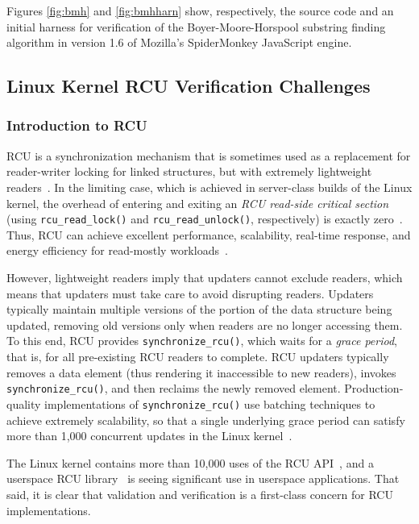 \documentclass[conference]{IEEEtran}
\newcommand{\co}[1]{\lstinline[breaklines=yes,breakatwhitespace=yes]{#1}}
\begin{document}
Figures \ref{fig:bmh} and \ref{fig:bmhharn} show, respectively, the
source code and an initial harness for verification of the
Boyer-Moore-Horspool substring finding algorithm \cite{BMH,CFV13} in
version 1.6 of Mozilla's SpiderMonkey JavaScript engine.

\subsection{Linux Kernel RCU Verification Challenges}

\subsubsection{Introduction to RCU}
\label{sec:Introduction to RCU}

RCU is a synchronization mechanism that is sometimes used as a replacement
for reader-writer locking for linked structures, but with extremely
lightweight readers~\cite{McKenney:2013:SDS:2483852.2483867}.
In the limiting case, which is achieved in server-class builds of the
Linux kernel, the overhead of entering and exiting an \emph{RCU read-side
critical section} (using \co{rcu_read_lock()} and \co{rcu_read_unlock()},
respectively) is exactly zero~\cite{McKenney98}.
Thus, RCU can achieve excellent performance, scalability, real-time
response, and energy efficiency for read-mostly
workloads~\cite{McKenney:2013:SDS:2483852.2483867,DinakarGuniguntala2008IBMSysJ,PaulMcKenney2013AMPenergyHOTPAR}.

However, lightweight readers imply that updaters cannot exclude readers,
which means that updaters must take care to avoid disrupting readers.
Updaters typically maintain multiple versions of the portion of the
data structure being updated, removing old versions only when
readers are no longer accessing them.
To this end, RCU provides \co{synchronize_rcu()}, which waits for a
\emph{grace period}, that is, for all pre-existing RCU readers to complete.
RCU updaters typically removes a data element (thus rendering it
inaccessible to new readers), invokes \co{synchronize_rcu()},
and then reclaims the newly removed element.
Production-quality implementations of \co{synchronize_rcu()} use batching
techniques to achieve extremely scalability, so that a single underlying
grace period can satisfy more than 1,000 concurrent updates in the
Linux kernel~\cite{Sarma04c}.

The Linux kernel contains more than 10,000 uses of the RCU
API~\cite{PaulEMcKenneyRCUusagePage}, and a userspace RCU
library~\cite{MathieuDesnoyers2009URCU,MathieuDesnoyers2012URCU}
is seeing significant use in userspace applications.
That said, it is clear that validation and verification is a first-class
concern for RCU implementations.
\end{document}
